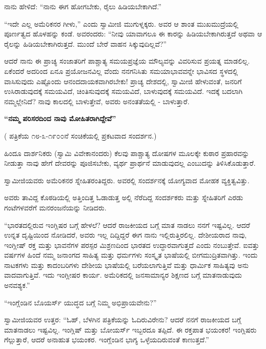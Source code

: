 ನಾನು ಹೇಳಿದೆ: “ನಾನು ಈಗ ಹೋಗಬೇಕು, ರೈಲು ಹಿಡಿಯಬೇಕಾಗಿದೆ.”

“ಇದೇ ಎಲ್ಲ ಅಮೆರಿಕನರ ಗೀಳು,” ಎಂದು ಸ್ವಾಮೀಜಿ ಮುಗುಳ್ನಕ್ಕರು. ಅವರ ಆ ಶಾಂತ ಮುಖಮುದ್ರೆಯಲ್ಲಿ ಪೂರ್ಣತ್ವದ ಹೊಳಹನ್ನು ಕಂಡೆ. ಅವರಂದರು: “ನೀವು ಯಾವಾಗಲೂ ಈ ಕಾರನ್ನು ಹಿಡಿಯಬೇಕಾಗಿರುತ್ತದೆ ಅಥವಾ ಆ ರೈಲನ್ನು ಹಿಡಿಯಬೇಕಾಗಿರುತ್ತದೆ. ಮುಂದೆ ಬೇರೆ ವಾಹನ ಸಿಕ್ಕುವುದಿಲ್ಲವೆ?”

ಆದರೆ ನಾನು ಈ ಪ್ರಾಚ್ಯ ಸಂಜಾತರಿಗೆ ಪಾಶ್ಚಾತ್ಯ ಸಮಯಪ್ರಜ್ಞೆಯ ಮೌಲ್ಯವನ್ನು ವಿವರಿಸುವ ಪ್ರಯತ್ನ ಮಾಡಲಿಲ್ಲ. ಏಕೆಂದರೆ ಅದರಿಂದ ಏನೂ ಪ್ರಯೋಜನವಿಲ್ಲ ವೆಂದು ನನಗನಿಸಿತು  ಸಮಯಾಭಾವವನ್ನೇ ಭಾವಿಸದ ಸ್ಥಳದಲ್ಲಿ ವಾಸಿಸುವುದು ಎಷ್ಟೊಂದು ಆನಂದದಾಯಕವಾಗಿರಬೇಕು! ಪ್ರಾಚ್ಯ ದೇಶದಲ್ಲಿ, ಸ್ವಾಮೀಜಿ ಹೇಳುವಂತೆ, ಜನರಿಗೆ ಉಸಿರಾಡುವುದಕ್ಕೆ ಸಮಯವಿದೆ, ಚಿಂತಿಸುವುದಕ್ಕೆ ಸಮಯವಿದೆ, ಬಾಳುವುದಕ್ಕೆ ಸಮಯವಿದೆ. ಇದಕ್ಕೆ ಬದಲಾಗಿ ನಮ್ಮಲ್ಲೇನಿದೆ? ನಾವು ಕಾಲದಲ್ಲಿ ಬಾಳುತ್ತೇವೆ, ಅವರು ಅನಂತತೆಯಲ್ಲಿ - ಬಾಳುತ್ತಾರೆ.

\begin{center}
\textbf{“ನಮ್ಮ ಪರಿಸರದಿಂದ ನಾವು ಮೋಹಿತರಾಗಿದ್ದೇವೆ”}
\end{center}

( ಪತ್ರಿಕೆಯ ೧೮-೩-೧೯೦೦ನೆ ಸಂಚಿಕೆಯಲ್ಲಿ ಪ್ರಕಟವಾದ ಸಂದರ್ಶನ.)

ಹಿಂದೂ ದಾರ್ಶನಿಕರು (ಸ್ವಾಮಿ ವಿವೇಕಾನಂದರು) ಕೆಲವು ಪಾಶ್ಚಾತ್ಯ ದೋಷಗಳ ಮೂಲಕ್ಕೇ ಕುಠಾರ ಪ್ರಹಾರವನ್ನು ನೀಡುತ್ತಾ ನಾವು ಹೇಗೆ ದೇವರನ್ನು ಪೂಜಿಸಬೇಕು, ವ್ಯರ್ಥ ಪ್ರಾರ್ಥನೆ ಮಾಡುವುದಲ್ಲ ಎಂಬುದನ್ನು ತಿಳಿಸಿಕೊಡುತ್ತಾರೆ.

ಸ್ವಾಮೀಜಿಯವರು ಅಮೆರಿಕನರ ಸ್ನೇಹಿತರಂತಿದ್ದರು. ಅವರಲ್ಲಿ ಸಂದರ್ಶನಕ್ಕೆ ಯೋಗ್ಯವಾದ ಮೋಹಕ ವ್ಯಕ್ತಿತ್ವವಿತ್ತು.

ಅವರು ತಾವಿದ್ದ ಕೊಠಡಿಯಲ್ಲಿ ಅತ್ತಿಂದಿತ್ತ ಓಡಾಡುತ್ತ ಅಲ್ಲಿ ನೆರೆದಿದ್ದ ಸಂದರ್ಶಕರು ಮತ್ತು ಸ್ನೇಹಿತರಿಗೆ ಎರಡು ಗಂಟೆಗಳವರೆಗೆ ಮನರಂಜನೆಯನ್ನು ನೀಡಿದರು.

“ಭಾರತದಲ್ಲಿರುವ ಇಂಗ್ಲಿಷರ ಬಗ್ಗೆ ಹೇಳಲೆ? ಆದರೆ ರಾಜಕೀಯದ ಬಗ್ಗೆ ಮಾತ ನಾಡಲು ನನಗೆ ಇಷ್ಟವಿಲ್ಲ. ಆದರೆ ಉನ್ನತ ದೃಷ್ಟಿಯಿಂದ ನೋಡಿದರೆ, ಅವರು ಇಲ್ಲ ದಿದ್ದಿದ್ದರೆ ಈಗ ನಾನು ಇಲ್ಲಿರುತ್ತಿರಲಿಲ್ಲ. ದೇಶೀಯರಾದ ನಾವು, ಇಂಗ್ಲೀಷ್ ರಕ್ತ ಮತ್ತು ಭಾವನೆಗಳ ಪರಸ್ಪರ ಮಿಶ್ರಣದಿಂದ ಭಾರತದ ಉದ್ಧಾರವಾಗುತ್ತದೆ ಎಂದು ನಂಬುತ್ತೇವೆ. ಐವತ್ತು ವರ್ಷಗಳ ಹಿಂದೆ ನಮ್ಮ ಜನಾಂಗದ ಸಾಹಿತ್ಯ ಮತ್ತು ಧರ್ಮಗಳು ಸಂಸ್ಕೃತ ಭಾಷೆಯಲ್ಲಿ ಬೀಗಮುದ್ರಿತವಾಗಿತ್ತು. ಇಂದು ನಾಟಕಗಳು ಮತ್ತು ಕಾದಂಬರಿಗಳು ದೇಶೀಯ ಭಾಷೆಯಲ್ಲಿ ಬರೆಯಲಾಗುತ್ತಿವೆ ಮತ್ತು ಧಾರ್ಮಿಕ ಸಾಹಿತ್ಯವು ಅನು ವಾದವಾಗುತ್ತಿವೆ. ಇದು ಇಂಗ್ಲೀಷರ ಕಾರ್ಯ. ಅಮೆರಿಕದಲ್ಲಿ ಜನಸಾಮಾನ್ಯರ ಶಿಕ್ಷಣದ ಬಗ್ಗೆ ಮಾತನಾಡುವುದು ಅನವಶ್ಯಕ.”

“ಇಂಗ್ಲೆಂಡಿನ ಬೊಯರ್ಸ್ ಯುದ್ಧದ ಬಗ್ಗೆ ನಿಮ್ಮ ಅಭಿಪ್ರಾಯವೇನು?”

ಸ್ವಾಮೀಜಿಯವರ ಉತ್ತರ: “ಓಹ್, ಬೆಳಗಿನ ಪತ್ರಿಕೆಯನ್ನು ಓದಿರುವಿರೇನು? ಆದರೆ ನನಗೆ ರಾಜಕೀಯದ ಬಗ್ಗೆ ಮಾತನಾಡಲು ಇಷ್ಟವಿಲ್ಲ. ಇಂಗ್ಲಿಷ್ ಮತ್ತು ಬೋಯರ್ಸ್ ಇಬ್ಬರದೂ ತಪ್ಪಿದೆ. ಈ ರಕ್ತಪಾತ ಭಯಂಕರ! ಇಂಗ್ಲಿಷರು ಗೆಲ್ಲುತ್ತಾರೆ, ಆದರೆ ಅನಾಹುತ ಭಯಂಕರ. ಇಂಗ್ಲೆಂಡಿನ ಭಾಗ್ಯ ಒಳ್ಳೆಯದಿರುವಂತೆ ಕಾಣುತ್ತದೆ.”

